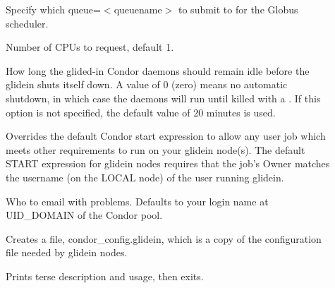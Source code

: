 \begin{description}
\item[]
	Specify which queue=$<$queuename$>$ to submit to for the Globus scheduler.

\item[]
	Number of CPUs to request, default 1.

\item[]
	How long the glided-in Condor daemons should remain idle before the
	glidein shuts itself down. A value of 0 (zero) means no automatic shutdown,
	in which case the daemons will run until killed with a .
	If this option is not specified, the default value of 20 minutes is used.

\item[]
	Overrides the default Condor start expression to allow any user job which
	meets other requirements to run on your glidein node(s). The default START
	expression for glidein nodes requires that the job's Owner matches the
	username (on the LOCAL node) of the user running glidein.

\item[]
	Who to email with problems. Defaults to your login name at UID\_DOMAIN of the Condor pool.

\item[]
	Creates a file, condor\_config.glidein, which is a copy of the configuration
	file needed by glidein nodes.

\item[]
   Prints terse description and usage, then exits.
\end{description}
